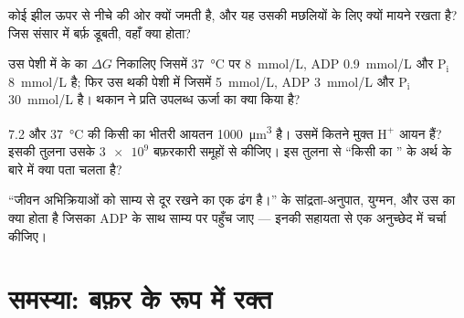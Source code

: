 \begin{exercise}[$\star\star$]\label{exo:b1:water-small-molecules:9}
कोई झील ऊपर से नीचे की ओर क्यों जमती है, और यह उसकी मछलियों के लिए
क्यों मायने रखता है? जिस संसार में बर्फ़ डूबती, वहाँ क्या होता?
\end{exercise}

\begin{exercise}[$\star\star\star$]\label{exo:b1:water-small-molecules:10}
उस पेशी  में  के  का $\Delta G$ निकालिए जिसमें
\qty{37}{\celsius} पर  \qty{8}{mmol/L}, ADP \qty{0.9}{mmol/L} और
$\mathrm{P_i}$ \qty{8}{mmol/L} है; फिर उस थकी पेशी में जिसमें
 \qty{5}{mmol/L}, ADP \qty{3}{mmol/L} और $\mathrm{P_i}$
\qty{30}{mmol/L} है। थकान ने प्रति  उपलब्ध ऊर्जा का क्या किया है?
\end{exercise}

\begin{exercise}[$\star\star\star$]\label{exo:b1:water-small-molecules:11}
 7.2 और \qty{37}{\celsius} की किसी  का भीतरी आयतन
\qty{1000}{\micro m^3} है। उसमें कितने मुक्त $\mathrm{H^+}$ आयन हैं?
इसकी तुलना उसके $\num{3e9}$ बफ़रकारी समूहों से कीजिए। इस तुलना से
``किसी  का '' के अर्थ के बारे में क्या पता चलता है?
\end{exercise}

\begin{exercise}[$\star\star\star$]\label{exo:b1:water-small-molecules:12}
``जीवन अभिक्रियाओं को साम्य से दूर रखने का एक ढंग है।''  के
सांद्रता-अनुपात, युग्मन, और उस  का क्या होता है जिसका  ADP के
साथ साम्य पर पहुँच जाए --- इनकी सहायता से एक अनुच्छेद में चर्चा कीजिए।
\end{exercise}

\section{समस्या: बफ़र के रूप में रक्त}

